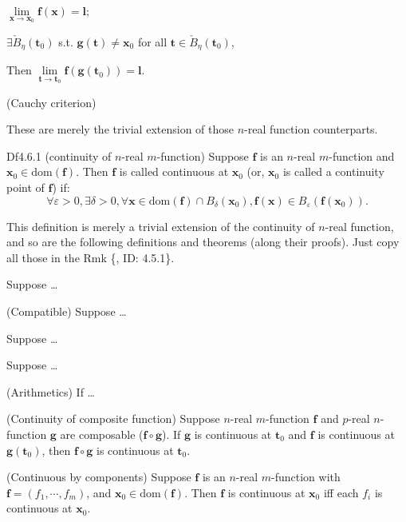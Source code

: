 \documentclass{article}
\begin{document}
\begin{Rmk}{}
{\begin{compactenum}
\begin{compactenum}
            \item $\lim\limits_{\pmb{x}\to\pmb{x}_0} \pmb{f}(\pmb{x}) = \pmb{l}$;
            \item $\exists \check{B}_\eta(\pmb{t}_0)$ s.t. $\pmb{g}(\pmb{t})\neq \pmb{x}_0$ for all $\pmb{t}\in\check{B}_\eta(\pmb{t}_0)$,
        \end{compactenum}
        Then $\lim\limits_{\pmb{t}\to\pmb{t}_0} \pmb{f}(\pmb{g}(\pmb{t}_0)) = \pmb{l}$.
        \item (Cauchy criterion) 
    \end{compactenum}}
    These are merely the trivial extension of those $n$-real function counterparts.
\end{Rmk}

\begin{Df}{Df4.6.1 (continuity of $n$-real $m$-function)}
    Suppose $\pmb{f}$ is an $n$-real $m$-function and $\pmb{x}_0\in\text{dom}(\pmb{f})$. Then $\pmb{f}$ is called continuous at $\pmb{x}_0$ (or, $\pmb{x}_0$ is called a continuity point of $\pmb{f}$) if:
    $$\forall\varepsilon>0, \exists\delta>0, \forall \pmb{x}\in\text{dom}(\pmb{f})\cap B_\delta(\pmb{x}_0), \pmb{f}(\pmb{x})\in B_\varepsilon(\pmb{f}(\pmb{x}_0)).$$
\end{Df}

\begin{Rmk}{}
    This definition is merely a trivial extension of the continuity of $n$-real function, and so are the following definitions and theorems (along their proofs). Just copy all those in the Rmk \{, ID: 4.5.1\}.
    \begin{compactenum}
        \item \textcolor{Df}{Suppose \dots}
        \item \textcolor{Th}{(Compatible) Suppose \dots}
        \item \textcolor{Th}{Suppose \dots}
        \item \textcolor{Th}{Suppose \dots}
        \item \textcolor{Th}{(Arithmetics) If \dots}
        \item \textcolor{Th}{(Continuity of composite function) Suppose $n$-real $m$-function $\pmb{f}$ and $p$-real $n$-function $\pmb{g}$ are composable ($\pmb{f}\circ\pmb{g}$). If $\pmb{g}$ is continuous at $\pmb{t}_0$ and $\pmb{f}$ is continuous at $\pmb{g}(\pmb{t}_0)$, then $\pmb{f}\circ\pmb{g}$ is continuous at $\pmb{t}_0$.}
        \item \textcolor{Th}{(Continuous by components) Suppose $\pmb{f}$ is an $n$-real $m$-function with $\pmb{f} = (f_1, \cdots, f_m)$, and $\pmb{x}_0\in\text{dom}(\pmb{f})$. Then $\pmb{f}$ is continuous at $\pmb{x}_0$ iff each $f_i$ is continuous at $\pmb{x}_0$.}
    \end{compactenum}
\end{Rmk}
\end{document}
